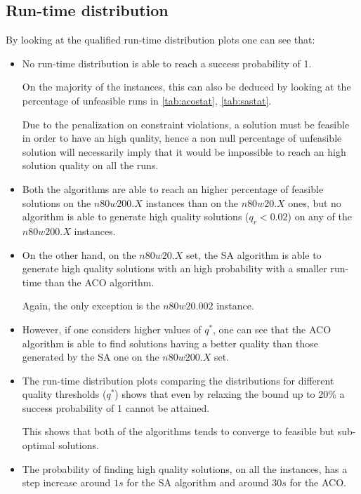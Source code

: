 \subsection{Run-time distribution}
By looking at the qualified run-time distribution plots one can see that:
\begin{itemize}

\item No run-time distribution is able to reach a success probability of 1.

On the majority of the instances, this can also be deduced by looking at the percentage of unfeasible runs in \ref{tab:acostat}, \ref{tab:sastat}. 

Due to the penalization on constraint violations, a solution must be feasible in order to have an high quality, hence a non null percentage of unfeasible solution will necessarily imply that it would be impossible to reach an high solution quality on all the runs.  


\item Both the algorithms are able to reach an higher percentage of feasible solutions on the $n80w200.X$ instances than on the $n80w20.X$ ones, but no algorithm is able to generate high quality solutions ($q_r < 0.02$) on any of the $n80w200.X$ instances.

\item On the other hand, on the $n80w20.X$ set, the SA algorithm is able to generate high quality solutions with an high probability with a smaller run-time than the ACO algorithm.

Again, the only exception is the $n80w20.002$ instance.

\item However, if one considers higher values of $q^{*}$, one can see that the ACO algorithm is able to find solutions having a better quality than those generated by the SA one on the $n80w200.X$ set.

\item The run-time distribution plots comparing the distributions for different quality thresholds ($q^{*}$) shows that even by relaxing the bound up to 20\% a success probability of 1 cannot be attained.

This shows that both of the algorithms tends to converge to feasible but sub-optimal solutions.

\item The probability of finding high quality solutions, on all the instances, has a step increase around $1s$ for the SA algorithm and around $30s$ for the ACO.
 
\end{itemize}
